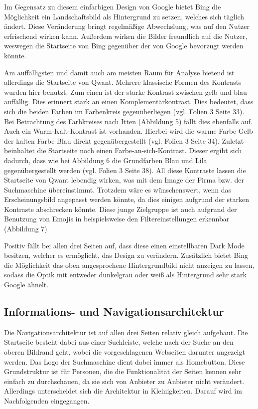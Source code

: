 \documentclass[11pt]{article}
\begin{document}
Im Gegensatz zu diesem einfarbigen Design von Google bietet Bing die Möglichkeit ein Landschaftsbild als Hintergrund zu
setzen, welches sich täglich ändert. Diese Veränderung bringt regelmäßige Abwechslung, was auf den Nutzer erfrischend wirken
kann. Außerdem wirken die Bilder freundlich auf die Nutzer, weswegen die Startseite von Bing gegenüber der von Google
bevorzugt werden könnte.

Am auffälligsten und damit auch am meisten Raum für Analyse bietend ist allerdings die Startseite von Qwant. Mehrere
klassische Formen des Kontrasts wurden hier benutzt. Zum einen ist der starke Kontrast zwischen gelb und blau auffällig.
Dies erinnert stark an einen Komplementärkontrast. Dies bedeutet, dass sich die beiden Farben im Farbenkreis gegenüberliegen
(vgl. Folien 3 Seite 33). Bei Betrachtung des Farbkreises nach Itten (Abbildung 5) fällt dies ebenfalls auf. Auch ein
Warm-Kalt-Kontrast ist vorhanden. Hierbei wird die warme Farbe Gelb der kalten Farbe Blau direkt gegenübergestellt
(vgl. Folien 3 Seite 34). Zuletzt beinhaltet die Startseite noch einen Farbe-an-sich-Kontrast. Dieser ergibt sich dadurch,
dass wie bei Abbildung 6 die Grundfarben Blau und Lila gegenübergestellt werden (vgl. Folien 3 Seite 38). All diese Kontraste
lassen die Startseite von Qwant lebendig wirken, was mit dem Image der Firma bzw. der Suchmaschine übereinstimmt.
Trotzdem wäre es wünschenswert, wenn das Erscheinungsbild angepasst werden könnte, da dies einigen aufgrund der starken
Kontraste abschrecken könnte. Diese junge Zielgruppe ist auch aufgrund der Benutzung von Emojis in beispielsweise den
Filtereinstellungen erkennbar (Abbildung 7)

Positiv fällt bei allen drei Seiten auf, dass diese einen einstellbaren Dark Mode besitzen, welcher es ermöglicht, das
Design zu verändern. Zusätzlich bietet Bing die Möglichkeit das oben angesprochene Hintergrundbild nicht anzeigen zu lassen,
sodass die Optik mit entweder dunkelgrau oder weiß als Hintergrund sehr stark Google ähnelt.

\subsection{Informations- und Navigationsarchitektur}
Die Navigationsarchitektur ist auf allen drei Seiten relativ gleich aufgebaut. Die Startseite besteht dabei aus einer
Suchleiste, welche nach der Suche an den oberen Bildrand geht, wobei die vorgeschlagenen Webseiten darunter angezeigt werden.
Das Logo der Suchmaschine dient dabei immer als Homebutton. Diese Grundstruktur ist für Personen, die die Funktionalität der
Seiten kennen sehr einfach zu durchschauen, da sie sich von Anbieter zu Anbieter nicht verändert. Allerdings unterscheidet
sich die Architektur in Kleinigkeiten. Darauf wird im Nachfolgenden eingegangen.
\end{document}
